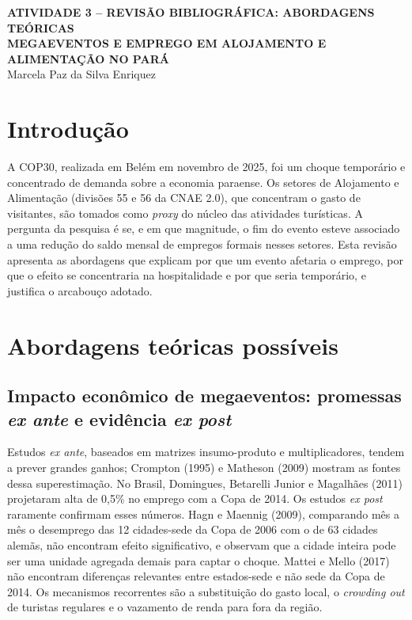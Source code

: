 \documentclass[12pt,a4paper]{article}
\begin{document}
\begin{center}
  {\bfseries ATIVIDADE 3 -- REVISÃO BIBLIOGRÁFICA: ABORDAGENS TEÓRICAS\\
  MEGAEVENTOS E EMPREGO EM ALOJAMENTO E ALIMENTAÇÃO NO PARÁ}\\[6pt]
  Marcela Paz da Silva Enriquez
\end{center}

\section{Introdução}

A COP30, realizada em Belém em novembro de 2025, foi um choque temporário e
concentrado de demanda sobre a economia paraense. Os setores de Alojamento e
Alimentação (divisões 55 e 56 da CNAE 2.0), que concentram o gasto de
visitantes, são tomados como \textit{proxy} do núcleo das atividades
turísticas. A pergunta da pesquisa é se, e em que magnitude, o fim do evento
esteve associado a uma redução do saldo mensal de empregos formais nesses
setores. Esta revisão apresenta as abordagens que explicam por que um evento
afetaria o emprego, por que o efeito se concentraria na hospitalidade e por
que seria temporário, e justifica o arcabouço adotado.

\section{Abordagens teóricas possíveis}

\subsection{Impacto econômico de megaeventos: promessas \textit{ex ante} e evidência \textit{ex post}}

Estudos \textit{ex ante}, baseados em matrizes insumo-produto e
multiplicadores, tendem a prever grandes ganhos; Crompton (1995) e Matheson
(2009) mostram as fontes dessa superestimação. No Brasil, Domingues,
Betarelli Junior e Magalhães (2011) projetaram alta de 0,5\% no emprego com a
Copa de 2014. Os estudos \textit{ex post} raramente confirmam esses números.
Hagn e Maennig (2009), comparando mês a mês o desemprego das 12 cidades-sede da
Copa de 2006 com o de 63 cidades alemãs, não encontram efeito significativo, e
observam que a cidade inteira pode ser uma unidade agregada demais para captar
o choque. Mattei e Mello (2017) não encontram diferenças relevantes entre
estados-sede e não sede da Copa de 2014. Os mecanismos recorrentes são a
substituição do gasto local, o \textit{crowding out} de turistas regulares e o
vazamento de renda para fora da região.
\end{document}
